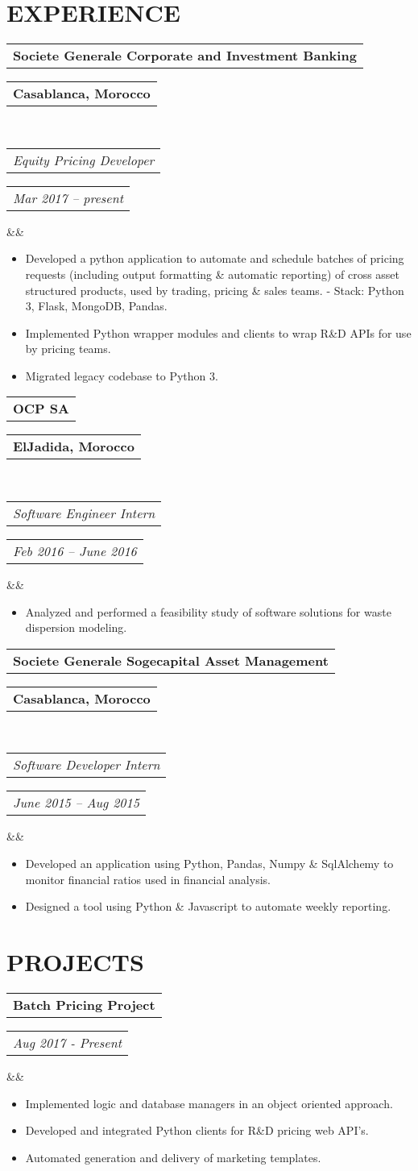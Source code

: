 \documentclass[11pt,a4paper,roman]{moderncv}        %
\makeatletter
\newcommand*{\customcventry}[7][.25em]{
  \begin{tabular}{@{}l} 
    {\bfseries #4}
  \end{tabular}
  \hfill%
  \begin{tabular}{l@{}}
     {\bfseries #5}
  \end{tabular} \\
  \begin{tabular}{@{}l} 
    {\itshape #3}
  \end{tabular}
  \hfill%
  \begin{tabular}{l@{}}
     {\itshape #2}
  \end{tabular}
  \ifx&#7&%
  \else{\\%
    \begin{minipage}{\maincolumnwidth}%
      \small#7%
    \end{minipage}}\fi%
  \par\addvspace{#1}}
\newcommand*{\customcvproject}[4][.25em]{
  \begin{tabular}{@{}l} 
    {\bfseries #2}
  \end{tabular}
  \hfill%
  \begin{tabular}{l@{}}
     {\itshape #3}
  \end{tabular}
  \ifx&#4&%
  \else{\\%
    \begin{minipage}{\maincolumnwidth}%
      \small#4%
    \end{minipage}}\fi%
  \par\addvspace{#1}}
\makeatother
\begin{document}
\section{EXPERIENCE}
%
{\customcventry{Mar 2017 – present}{Equity Pricing Developer}{Societe Generale Corporate and Investment Banking}{Casablanca, Morocco}{}{}
{\begin{itemize}
  \item Developed a python application to automate and schedule batches of pricing requests  (including output formatting \& automatic reporting) of cross asset structured products, used by trading, pricing \& sales teams.
  	\newline - Stack: Python 3,  Flask, MongoDB, Pandas.
  \item Implemented Python wrapper modules and clients to wrap R\&D APIs for use  by pricing teams.
  \item Migrated legacy codebase to Python 3.
  
\end{itemize}
}

{\customcventry{Feb 2016 – June 2016}{Software Engineer Intern}{OCP SA}{ElJadida, Morocco}{}{}
{\begin{itemize}
  \item Analyzed and performed a feasibility study of software solutions for waste dispersion modeling.
  \end{itemize}
}

{\customcventry{June 2015 – Aug 2015}{Software Developer Intern}{Societe Generale  Sogecapital Asset Management}{Casablanca, Morocco}{}{}
{\begin{itemize}
  \item Developed an  application using Python, Pandas, Numpy \& SqlAlchemy to monitor financial ratios used in financial analysis.
  \item Designed a tool using Python \& Javascript to automate weekly reporting.
\end{itemize}
}

\section{PROJECTS}

{\customcvproject{Batch Pricing Project}{Aug 2017 - Present}{}{}{}{}{}
  {\begin{itemize}
    \item Implemented logic and database managers in an object oriented approach.
    \item Developed and integrated Python clients for R\&D pricing web API's.
    \item Automated generation and delivery of marketing templates.
    

\end{itemize}}}}}}
\end{document}
